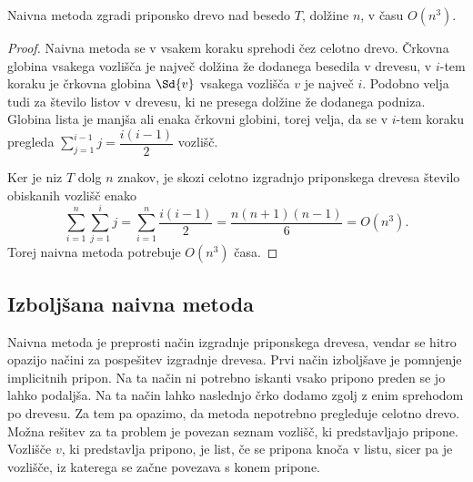 \begin{izr}\label{izr:naivna}
    Naivna metoda zgradi priponsko drevo nad besedo $T$, dolžine $n$, v času $O(n^3)$.
\end{izr}

\begin{proof}
    Naivna metoda se v vsakem koraku sprehodi čez celotno drevo. Črkovna globina vsakega vozlišča je največ dolžina že dodanega besedila v drevesu, v $i$-tem koraku je črkovna globina $\Sd{v}$ vsakega vozlišča $v$ je največ $i$. Podobno velja tudi za število listov v drevesu, ki ne presega dolžine že dodanega podniza. Globina lista je manjša ali enaka črkovni globini, torej velja, da se v $i$-tem koraku pregleda $\sum_{j=1}^{i-1} j=\dfrac{i(i-1)}{2}$ vozlišč.

    Ker je niz $T$ dolg $n$ znakov, je skozi celotno izgradnjo priponskega drevesa število obiskanih vozlišč enako
    $$
        \sum_{i=1}^n \sum_{j=1}^i j=\sum_{i=1}^n \dfrac{i(i-1)}{2}=\dfrac{n(n+1)(n-1)}{6}=O(n^3).
    $$
    Torej naivna metoda potrebuje $O(n^3)$ časa.
\end{proof}

\subsection{Izboljšana naivna metoda}
Naivna metoda je preprosti način izgradnje priponskega drevesa, vendar se hitro opazijo načini za pospešitev izgradnje drevesa. Prvi način izboljšave je pomnjenje implicitnih pripon. Na ta način ni potrebno iskanti vsako pripono preden se jo lahko podaljša. Na ta način lahko naslednjo črko dodamo zgolj z enim sprehodom po drevesu. Za tem pa opazimo, da metoda nepotrebno pregleduje celotno drevo. Možna rešitev za ta problem je povezan seznam vozlišč, ki predstavljajo pripone. Vozlišče $v$, ki predstavlja pripono, je list, če se pripona knoča v listu, sicer pa je vozlišče, iz katerega se začne povezava s konem pripone. 




